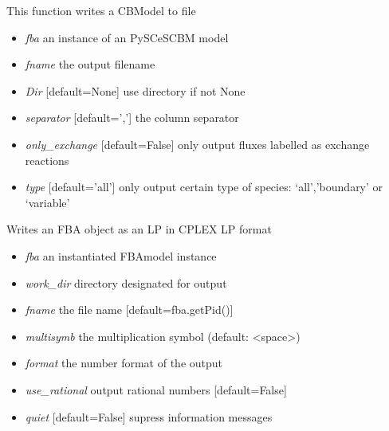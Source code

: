 \documentclass[a4paper,11pt,english]{sphinxmanual}
\begin{document}
\begin{fulllineitems}
\label{modules_doc:cbmpy.CBWrite.writeModelInfoToFile}
This function writes a CBModel to file
\begin{itemize}
\item {} 
\emph{fba} an instance of an PySCeSCBM model

\item {} 
\emph{fname} the output filename

\item {} 
\emph{Dir} {[}default=None{]} use directory if not None

\item {} 
\emph{separator} {[}default=','{]} the column separator

\item {} 
\emph{only\_exchange} {[}default=False{]} only output fluxes labelled as exchange reactions

\item {} 
\emph{type} {[}default='all'{]} only output certain type of species: `all','boundary' or `variable'

\end{itemize}

\end{fulllineitems}


\begin{fulllineitems}
\label{modules_doc:cbmpy.CBWrite.writeModelLP}
Writes an FBA object as an LP in CPLEX LP format
\begin{itemize}
\item {} 
\emph{fba} an instantiated FBAmodel instance

\item {} 
\emph{work\_dir} directory designated for output

\item {} 
\emph{fname} the file name {[}default=fba.getPid(){]}

\item {} 
\emph{multisymb} the multiplication symbol (default: \textless{}space\textgreater{})

\item {} 
\emph{format} the number format of the output

\item {} 
\emph{use\_rational} output rational numbers {[}default=False{]}

\item {} 
\emph{quiet} {[}default=False{]} supress information messages

\end{itemize}

\end{fulllineitems}
\end{document}
